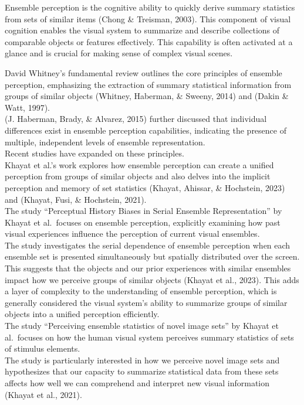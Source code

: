 \documentclass[print]{nuthesis}
\begin{document}
Ensemble perception is the cognitive ability to quickly derive summary statistics from sets of similar items (Chong \& Treisman, 2003).
This component of visual cognition enables the visual system to summarize and describe collections of comparable objects or features effectively.
This capability is often activated at a glance and is crucial for making sense of complex visual scenes.

David Whitney's fundamental review outlines the core principles of ensemble perception, emphasizing the extraction of summary statistical information from groups of similar objects (Whitney, Haberman, \& Sweeny, 2014) and (Dakin \& Watt, 1997).\\
(J. Haberman, Brady, \& Alvarez, 2015) further discussed that individual differences exist in ensemble perception capabilities, indicating the presence of multiple, independent levels of ensemble representation.\\
Recent studies have expanded on these principles.\\
Khayat et al.'s work explores how ensemble perception can create a unified perception from groups of similar objects and also delves into the implicit perception and memory of set statistics (Khayat, Ahissar, \& Hochstein, 2023) and (Khayat, Fusi, \& Hochstein, 2021).\\
The study ``Perceptual History Biases in Serial Ensemble Representation'' by Khayat et al.~focuses on ensemble perception, explicitly examining how past visual experiences influence the perception of current visual ensembles.\\
The study investigates the serial dependence of ensemble perception when each ensemble set is presented simultaneously but spatially distributed over the screen.\\
This suggests that the objects and our prior experiences with similar ensembles impact how we perceive groups of similar objects (Khayat et al., 2023).
This adds a layer of complexity to the understanding of ensemble perception, which is generally considered the visual system's ability to summarize groups of similar objects into a unified perception efficiently.\\
The study ``Perceiving ensemble statistics of novel image sets'' by Khayat et al.~focuses on how the human visual system perceives summary statistics of sets of stimulus elements.\\
The study is particularly interested in how we perceive novel image sets and hypothesizes that our capacity to summarize statistical data from these sets affects how well we can comprehend and interpret new visual information (Khayat et al., 2021).
\end{document}
